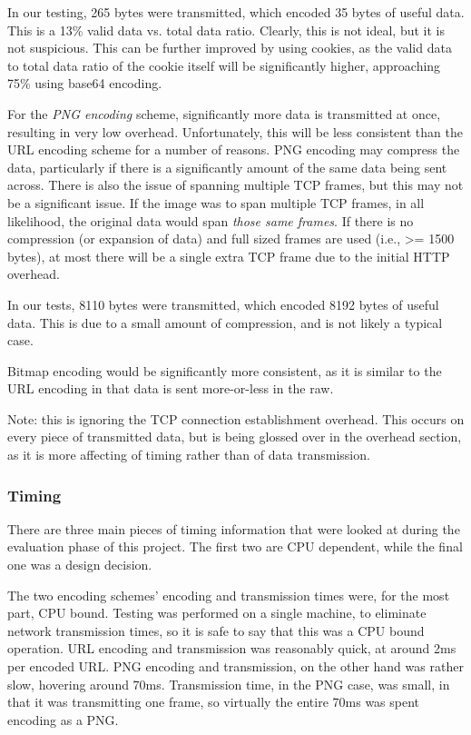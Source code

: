 In our testing, 265 bytes were transmitted, which encoded 35 bytes of useful data. This is a 13\% valid data vs. total data ratio. Clearly, this is not ideal, but it is not suspicious. This can be further improved by using cookies, as the valid data to total data ratio of the cookie itself will be significantly higher, approaching 75\% using base64 encoding.

For the \emph{PNG encoding} scheme, significantly more data is transmitted at once, resulting in very low overhead. Unfortunately, this will be less consistent than the URL encoding scheme for a number of reasons. PNG encoding may compress the data, particularly if there is a significantly amount of the same data being sent across. There is also the issue of spanning multiple TCP frames, but this may not be a significant issue. If the image was to span multiple TCP frames, in all likelihood, the original data would span \emph{those same frames}. If there is no compression (or expansion of data) and full sized frames are used (i.e., >= 1500 bytes), at most there will be a single extra TCP frame due to the initial HTTP overhead.

In our tests, 8110 bytes were transmitted, which encoded 8192 bytes of useful data. This is due to a small amount of compression, and is not likely a typical case.  

Bitmap encoding would be significantly more consistent, as it is similar to the URL encoding in that data is sent more-or-less in the raw.
	
Note: this is ignoring the TCP connection establishment overhead. This occurs on every piece of transmitted data, but is being glossed over in the overhead section, as it is more affecting of timing rather than of data transmission. 

\subsubsection{Timing}
There are three main pieces of timing information that were looked at during the evaluation phase of this project. The first two are CPU dependent, while the final one was a design decision. 

The two encoding schemes' encoding and transmission times were, for the most part, CPU bound. Testing was performed on a single machine, to eliminate network transmission times, so it is safe to say that this was a CPU bound operation. URL encoding and transmission was reasonably quick, at around 2ms per encoded URL. PNG encoding and transmission, on the other hand was rather slow, hovering around 70ms. Transmission time, in the PNG case, was small, in that it was transmitting one frame, so virtually the entire 70ms was spent encoding as a PNG.


